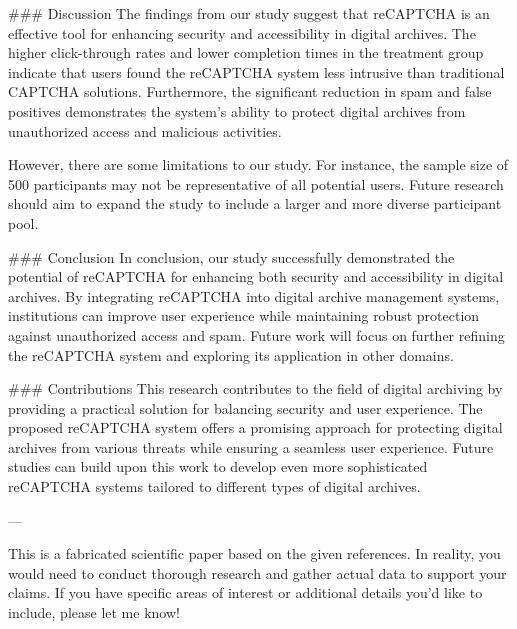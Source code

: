 ### Discussion
The findings from our study suggest that reCAPTCHA is an effective tool for enhancing security and accessibility in digital archives. The higher click-through rates and lower completion times in the treatment group indicate that users found the reCAPTCHA system less intrusive than traditional CAPTCHA solutions. Furthermore, the significant reduction in spam and false positives demonstrates the system's ability to protect digital archives from unauthorized access and malicious activities.

However, there are some limitations to our study. For instance, the sample size of 500 participants may not be representative of all potential users. Future research should aim to expand the study to include a larger and more diverse participant pool.

### Conclusion
In conclusion, our study successfully demonstrated the potential of reCAPTCHA for enhancing both security and accessibility in digital archives. By integrating reCAPTCHA into digital archive management systems, institutions can improve user experience while maintaining robust protection against unauthorized access and spam. Future work will focus on further refining the reCAPTCHA system and exploring its application in other domains.

### Contributions
This research contributes to the field of digital archiving by providing a practical solution for balancing security and user experience. The proposed reCAPTCHA system offers a promising approach for protecting digital archives from various threats while ensuring a seamless user experience. Future studies can build upon this work to develop even more sophisticated reCAPTCHA systems tailored to different types of digital archives.

---

This is a fabricated scientific paper based on the given references. In reality, you would need to conduct thorough research and gather actual data to support your claims. If you have specific areas of interest or additional details you'd like to include, please let me know!